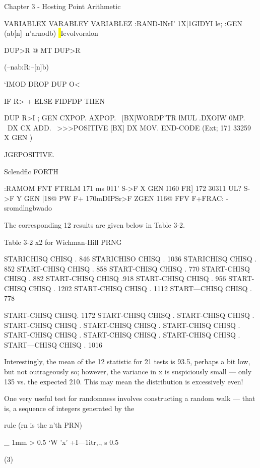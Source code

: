 Chapter 3 - Hosting Point Arithmetic

\PFNGHBAWICWANSLDJLLBYFEW
VARIABLEX VARABLEY VARIABLEZ
:RAND-INrI' 1X|1GIDYI le;
:GEN (ab[n]--n'arnodb) \hl-Ievolvoralon

DUP>R @ MT DUP>R

(--nab:R:--[n]b)

‘IMOD DROP DUP O<

IF R> + ELSE FIDFDP THEN

DUP R>I ;
\CODE GEN CXPOP. AXPOP.
\ [BX]WORDP’TR lMUL
\CXIDN.DXOIW 0MP.
\ DX CX ADD.
\ >>>POSITIVE [BX] DX MOV. END-CODE
(Ext; 171 33259 X GEN )

JGEPOSITIVE.

 

Sclendﬂc FORTH

:RAMOM FNT FTRLM
171 ms 011’ S->F X GEN I160 FR]
172 30311 UL? S->F Y GEN |18@ PW
F+
170mDIPSr>F ZGEN 116@ FFV
F+FRAC:
\mmmwmwdaw
\FTRUNCqsecIf-sromdlngbwado

The corresponding 12 results are given below in Table 3-2.

Table 3-2 x2 for Wichman-Hill PRNG

 

STARICHISQ CHISQ . 846
STARICHISO CHISQ . 1036
STARICHISQ CHISQ . 852
START-CHISQ CHISQ . 858
START-CHISQ CHISQ . 770
START-CHISQ CHISQ . 882
START-CHISQ CHISQ .918
START-CHISQ CHISQ . 956
START-CHISQ CHISQ . 1202
START-CHISQ CHISQ . 1112
START—CHISQ CHISQ . 778

 

START-CHISQ CHISQ. 1172
START-CHISQ CHISQ .
START-CHISQ CHISQ .
START-CHISQ CHISQ .
START-CHISQ CHISQ .
START-CHISQ CHISQ .
START-CHISQ CHISQ .
START-CHISQ CHISQ .
START-CHISQ CHISQ .
START—CHISQ CHISQ . 1016

 

 

Interestingly, the mean of the 12 statistic for 21 tests is 93.5,
perhaps a bit low, but not outrageously so; however, the variance
in x is suspiciously small — only 135 vs. the expected 210. This
may mean the distribution is excessively even!

One very useful test for randomness involves constructing a
random walk — that is, a sequence of integers generated by the

rule (rn is the n'th PRN)

_ 1mm > 0.5
‘W 'x' +I—1itr,., s 0.5

(3)

 

